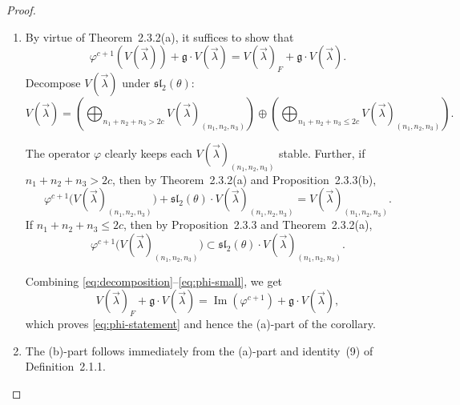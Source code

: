 \documentclass[12pt]{article}
\begin{document}
\begin{proof}
\begin{enumerate}
    \item By virtue of Theorem~2.3.2(a), it suffices to show that
\begin{equation}\label{eq:phi-statement}
\varphi^{c+1}(V(\vec\lambda))+\mathfrak g\cdot V(\vec\lambda)
=
V(\vec\lambda)_F+\mathfrak g\cdot V(\vec\lambda).
\tag{1}
\end{equation}
Decompose $V(\vec\lambda)$ under $\mathfrak{sl}_2(\theta)$:
\begin{equation}\label{eq:decomposition}
V(\vec\lambda)
=
\left(\bigoplus_{n_1+n_2+n_3>2c}V(\vec\lambda)_{(n_1,n_2,n_3)}\right)
\oplus
\left(\bigoplus_{n_1+n_2+n_3\le2c}V(\vec\lambda)_{(n_1,n_2,n_3)}\right).
\tag{2}
\end{equation}

The operator $\varphi$ clearly keeps each $V(\vec\lambda)_{(n_1,n_2,n_3)}$ stable.  
Further, if $n_1+n_2+n_3>2c$, then by Theorem~2.3.2(a) and Proposition~2.3.3(b),
\begin{equation}\label{eq:phi-large}
\varphi^{c+1}\big(V(\vec\lambda)_{(n_1,n_2,n_3)}\big)
+\mathfrak{sl}_2(\theta)\cdot V(\vec\lambda)_{(n_1,n_2,n_3)}
=
V(\vec\lambda)_{(n_1,n_2,n_3)}.
\tag{3}
\end{equation}
If $n_1+n_2+n_3\le2c$, then by Proposition~2.3.3 and Theorem~2.3.2(a),
\begin{equation}\label{eq:phi-small}
\varphi^{c+1}\big(V(\vec\lambda)_{(n_1,n_2,n_3)}\big)
\subset
\mathfrak{sl}_2(\theta)\cdot V(\vec\lambda)_{(n_1,n_2,n_3)}.
\tag{4}
\end{equation}

Combining \eqref{eq:decomposition}–\eqref{eq:phi-small}, we get
\[
V(\vec\lambda)_F+\mathfrak g\cdot V(\vec\lambda)
=\operatorname{Im}(\varphi^{c+1})+\mathfrak g\cdot V(\vec\lambda),
\]
which proves \eqref{eq:phi-statement} and hence the (a)-part of the corollary.

\item The (b)-part follows immediately from the (a)-part and identity~(9) of Definition~2.1.1.
\end{enumerate}
\end{proof}
\end{document}
